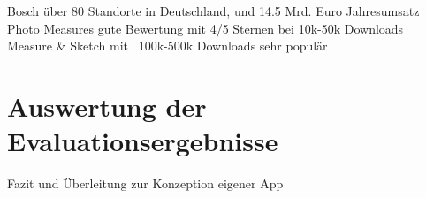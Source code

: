 Bosch über 80 Standorte in Deutschland, und 14.5 Mrd. Euro Jahresumsatz \\
Photo Measures gute Bewertung mit 4/5 Sternen bei 10k-50k Downloads \\
Measure \& Sketch mit ~100k-500k Downloads sehr populär \\





\section{Auswertung der Evaluationsergebnisse}
Fazit und Überleitung zur Konzeption eigener App

